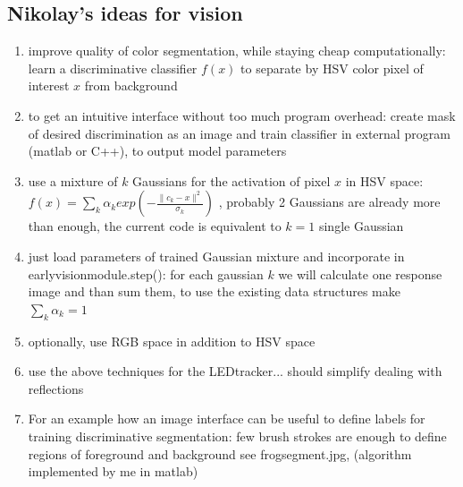 \subsection{Nikolay's ideas for vision}
\begin{enumerate}

\item improve quality of color segmentation, while staying cheap
  computationally: learn a discriminative classifier $f(x)$ to
  separate by HSV color pixel of interest $x$ from background

\item to get an intuitive interface without too much program overhead:
  create mask of desired discrimination as an image and train
  classifier in external program (matlab or C++), to output model
  parameters

\item use a mixture of $k$ Gaussians for the activation of pixel $x$
  in HSV space: $f(x) = \sum_k \alpha_k exp(- \frac{\|c_k -
    x\|^2}{\sigma_k})$ , probably 2 Gaussians are already more than
  enough, the current code is equivalent to $k=1$ single Gaussian

\item just load parameters of trained Gaussian mixture and incorporate
  in earlyvisionmodule.step(): for each gaussian $k$ we will calculate
  one response image and than sum them, to use the existing data
  structures make $\sum_k \alpha_k = 1$

\item optionally, use RGB space in addition to HSV space

\item use the above techniques for the LEDtracker... should simplify
  dealing with reflections

\item For an example how an image interface can be useful to define
  labels for training discriminative segmentation: few brush strokes
  are enough to define regions of foreground and background see
  frogsegment.jpg, (algorithm implemented by me in matlab)
\end{enumerate}




